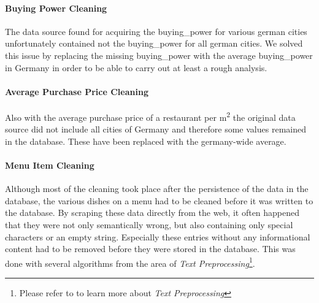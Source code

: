\paragraph{Buying Power Cleaning}
The data source found for acquiring the buying\_power for various german cities unfortunately contained not the buying\_power for all german cities.
We solved this issue by replacing the missing buying\_power with the average buying\_power in Germany in order to be able to carry out at least a rough analysis.
\paragraph{Average Purchase Price Cleaning}
Also with the average purchase price of a restaurant per m\textsuperscript{2} the original data source did not include all cities of Germany and therefore
some  values remained in the database.
These have been replaced with the germany-wide average.
\paragraph{Menu Item Cleaning}
Although most of the cleaning took place after the persistence of the data in the database, the various dishes on a menu had to be
cleaned before it was written to the database.
By scraping these data directly from the web, it often happened that they were not only semantically wrong, but also containing only
special characters or an empty string.
Especially these entries without any informational content had to be removed before they were stored in the database.
This was done with several algorithms from the area of \textit{Text Preprocessing}\footnote{Please refer to  to learn more about \textit{Text Preprocessing}}.

